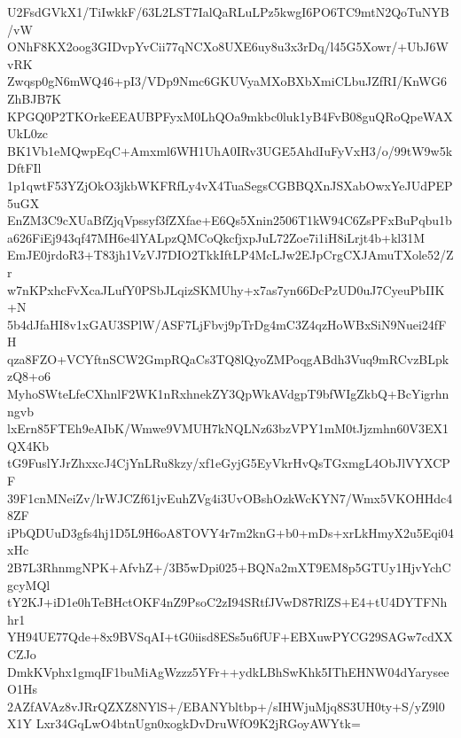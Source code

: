 U2FsdGVkX1/TiIwkkF/63L2LST7IalQaRLuLPz5kwgI6PO6TC9mtN2QoTuNYB/vW
ONhF8KX2oog3GIDvpYvCii77qNCXo8UXE6uy8u3x3rDq/l45G5Xowr/+UbJ6WvRK
Zwqsp0gN6mWQ46+pI3/VDp9Nmc6GKUVyaMXoBXbXmiCLbuJZfRI/KnWG6ZhBJB7K
KPGQ0P2TKOrkeEEAUBPFyxM0LhQOa9mkbc0luk1yB4FvB08guQRoQpeWAXUkL0zc
BK1Vb1eMQwpEqC+Amxml6WH1UhA0IRv3UGE5AhdIuFyVxH3/o/99tW9w5kDftFIl
1p1qwtF53YZjOkO3jkbWKFRfLy4vX4TuaSegsCGBBQXnJSXabOwxYeJUdPEP5uGX
EnZM3C9cXUaBfZjqVpssyf3fZXfae+E6Qs5Xnin2506T1kW94C6ZsPFxBuPqbu1b
a626FiEj943qf47MH6e4lYALpzQMCoQkcfjxpJuL72Zoe7i1iH8iLrjt4b+kl31M
EmJE0jrdoR3+T83jh1VzVJ7DIO2TkkIftLP4McLJw2EJpCrgCXJAmuTXole52/Zr
w7nKPxhcFvXcaJLufY0PSbJLqizSKMUhy+x7as7yn66DcPzUD0uJ7CyeuPbIIK+N
5b4dJfaHI8v1xGAU3SPlW/ASF7LjFbvj9pTrDg4mC3Z4qzHoWBxSiN9Nuei24fFH
qza8FZO+VCYftnSCW2GmpRQaCs3TQ8lQyoZMPoqgABdh3Vuq9mRCvzBLpkzQ8+o6
MyhoSWteLfeCXhnlF2WK1nRxhnekZY3QpWkAVdgpT9bfWIgZkbQ+BcYigrhnngvb
lxErn85FTEh9eAIbK/Wmwe9VMUH7kNQLNz63bzVPY1mM0tJjzmhn60V3EX1QX4Kb
tG9FuslYJrZhxxcJ4CjYnLRu8kzy/xf1eGyjG5EyVkrHvQsTGxmgL4ObJlVYXCPF
39F1cnMNeiZv/lrWJCZf61jvEuhZVg4i3UvOBshOzkWcKYN7/Wmx5VKOHHdc48ZF
iPbQDUuD3gfs4hj1D5L9H6oA8TOVY4r7m2knG+b0+mDs+xrLkHmyX2u5Eqi04xHc
2B7L3RhnmgNPK+AfvhZ+/3B5wDpi025+BQNa2mXT9EM8p5GTUy1HjvYchCgcyMQl
tY2KJ+iD1e0hTeBHctOKF4nZ9PsoC2zI94SRtfJVwD87RlZS+E4+tU4DYTFNhhr1
YH94UE77Qde+8x9BVSqAI+tG0iisd8ESs5u6fUF+EBXuwPYCG29SAGw7cdXXCZJo
DmkKVphx1gmqIF1buMiAgWzzz5YFr++ydkLBhSwKhk5IThEHNW04dYaryseeO1Hs
2AZfAVAz8vJRrQZXZ8NYlS+/EBANYbltbp+/sIHWjuMjq8S3UH0ty+S/yZ9l0X1Y
Lxr34GqLwO4btnUgn0xogkDvDruWfO9K2jRGoyAWYtk=
